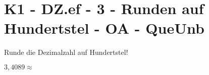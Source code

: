\section{K1 - DZ.ef - 3 - Runden auf Hundertstel - OA - QueUnb}

\begin{beispiel}{0} %
				Runde die Dezimalzahl auf Hundertstel!\leer
					
					$3,4089\approx$ 
\end{beispiel}